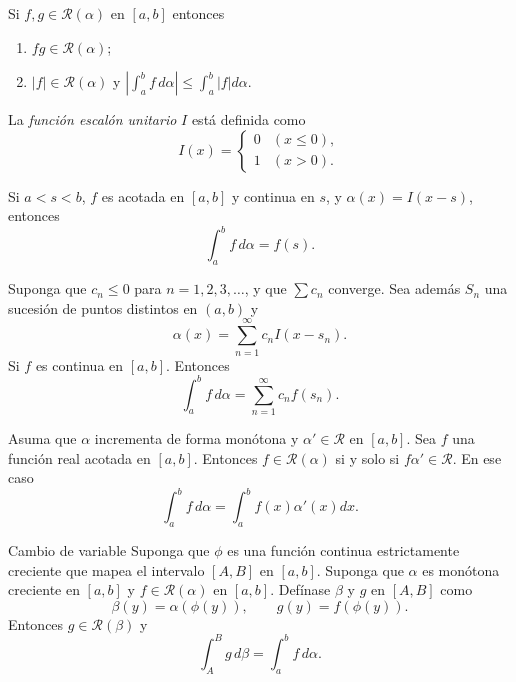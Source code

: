 \documentclass[11pt]{beamer}
\begin{document}
\begin{frame}[allowframebreaks]

\begin{theorem}[9]
Si $f, g \in \mathcal{R}(\alpha)$ en $[a, b]$ entonces
\begin{enumerate}
	\item $fg \in \mathcal{R}(\alpha)$;
	\item $|f| \in \mathcal{R}(\alpha)$ y $|\int_a^b f\,d\alpha| \leq \int_a^b |f| d\alpha$.
\end{enumerate}
\end{theorem}

\begin{definition}
La \textit{función escalón unitario} $I$ está definida como
\[
	I(x) = \begin{cases}
		0 & (x \leq 0),\\
		1 & (x > 0).
	\end{cases}
\]
\end{definition}

\begin{theorem}
Si $a < s < b$, $f$ es acotada en $[a, b]$ y continua en $s$, y $\alpha(x) = I(x-s)$, entonces
\[
	\int_a^b f\,d\alpha = f(s).
\]
\end{theorem}

\begin{theorem}
Suponga que $c_n \leq 0$ para $n = 1, 2, 3, \dots$, y que $\sum c_n$ converge. Sea además ${S_n}$ una sucesión de puntos distintos en $(a, b)$ y
\begin{equation}
	\alpha(x) = \sum_{n=1}^{\infty} c_n I(x-s_n).
\end{equation}
Si $f$ es continua en $[a, b]$. Entonces
\begin{equation}
	\int_a^b f\,d\alpha = \sum_{n=1}^{\infty} c_n f(s_n).
\end{equation}
\end{theorem}

\begin{theorem}
Asuma que $\alpha$ incrementa de forma monótona  y $\alpha' \in \mathcal{R}$ en $[a, b]$. Sea $f$ una función real acotada en $[a, b]$.
Entonces $f \in \mathcal{R}(\alpha)$ si y solo si $f\alpha' \in \mathcal{R}$. En ese caso
\begin{equation}
	\int_a^b f\,d\alpha = \int_a^b f(x)\alpha'(x) dx.
\end{equation}
\end{theorem}

\begin{theorem}{Cambio de variable}
Suponga que $\phi$ es una función continua estrictamente creciente que mapea el intervalo $[A, B]$ en $[a, b]$. Suponga que $\alpha$ es monótona creciente en $[a, b]$ y $f \in \mathcal{R}(\alpha)$ en $[a, b]$. Defínase $\beta$ y $g$ en $[A, B]$ como
\begin{equation}
	\beta(y) = \alpha(\phi(y)), \qquad g(y) = f(\phi(y)).
\end{equation}
Entonces $g \in \mathcal{R}(\beta)$ y
\begin{equation}
	\int_A^B g\,d\beta = \int_a^b f\,d\alpha.
\end{equation}
\end{theorem}

\end{frame}
\end{document}
